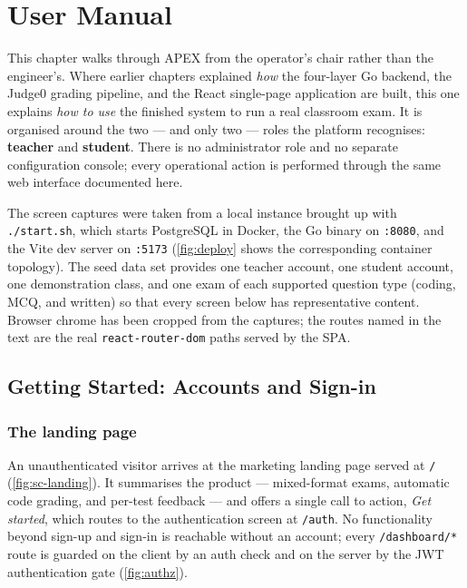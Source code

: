 \chapter{User Manual}\label{ch:ch12}

This chapter walks through APEX from the operator's chair rather than the
engineer's. Where earlier chapters explained \emph{how} the four-layer Go
backend, the Judge0 grading pipeline, and the React single-page application are
built, this one explains \emph{how to use} the finished system to run a real
classroom exam. It is organised around the two — and only two — roles the
platform recognises: \textbf{teacher} and \textbf{student}. There is no
administrator role and no separate configuration console; every operational
action is performed through the same web interface documented here.

The screen captures were taken from a local instance brought up with
\texttt{./start.sh}, which starts PostgreSQL in Docker, the Go binary on
\texttt{:8080}, and the Vite dev server on \texttt{:5173}
(\cref{fig:deploy} shows the corresponding container topology). The seed data
set provides one teacher account, one student account, one demonstration class,
and one exam of each supported question type (coding, MCQ, and written) so that
every screen below has representative content. Browser chrome has been cropped
from the captures; the routes named in the text are the real
\texttt{react-router-dom} paths served by the SPA.

\section{Getting Started: Accounts and Sign-in}

\subsection{The landing page}

An unauthenticated visitor arrives at the marketing landing page served at
\texttt{/} (\cref{fig:sc-landing}). It summarises the product — mixed-format
exams, automatic code grading, and per-test feedback — and offers a single
call to action, \emph{Get started}, which routes to the authentication screen
at \texttt{/auth}. No functionality beyond sign-up and sign-in is reachable
without an account; every \texttt{/dashboard/*} route is guarded on the client
by an auth check and on the server by the JWT authentication gate
(\cref{fig:authz}).

